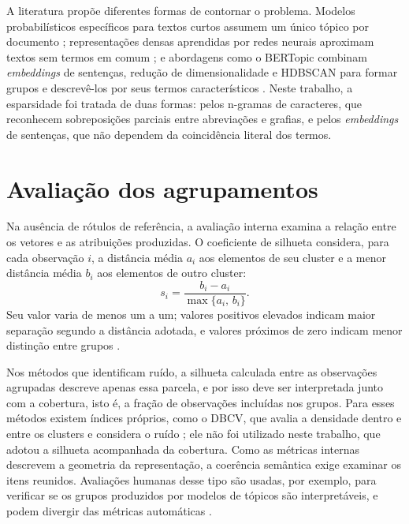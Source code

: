 \documentclass[english,brazilian]{UNISINOSmonografia}
\begin{document}
A literatura propõe diferentes formas de contornar o problema. Modelos probabilísticos específicos para textos curtos assumem um único tópico por documento \cite{yin2014dirichlet}; representações densas aprendidas por redes neurais aproximam textos sem termos em comum \cite{xu2017selftaught}; e abordagens como o BERTopic combinam \textit{embeddings} de sentenças, redução de dimensionalidade e HDBSCAN para formar grupos e descrevê-los por seus termos característicos \cite{grootendorst2022bertopic}. Neste trabalho, a esparsidade foi tratada de duas formas: pelos n-gramas de caracteres, que reconhecem sobreposições parciais entre abreviações e grafias, e pelos \textit{embeddings} de sentenças, que não dependem da coincidência literal dos termos.

\section{Avaliação dos agrupamentos}

Na ausência de rótulos de referência, a avaliação interna examina a relação entre os vetores e as atribuições produzidas. O coeficiente de silhueta \cite{rousseeuw1987silhouettes} considera, para cada observação $i$, a distância média $a_i$ aos elementos de seu cluster e a menor distância média $b_i$ aos elementos de outro cluster:
\begin{equation}
s_i=\frac{b_i-a_i}{\max\{a_i,\, b_i\}}.
\label{eq:silhueta}
\end{equation}
Seu valor varia de menos um a um; valores positivos elevados indicam maior separação segundo a distância adotada, e valores próximos de zero indicam menor distinção entre grupos \cite{sklearn-silhouette}.

Nos métodos que identificam ruído, a silhueta calculada entre as observações agrupadas descreve apenas essa parcela, e por isso deve ser interpretada junto com a cobertura, isto é, a fração de observações incluídas nos grupos. Para esses métodos existem índices próprios, como o DBCV, que avalia a densidade dentro e entre os clusters e considera o ruído \cite{moulavi2014dbcv}; ele não foi utilizado neste trabalho, que adotou a silhueta acompanhada da cobertura. Como as métricas internas descrevem a geometria da representação, a coerência semântica exige examinar os itens reunidos. Avaliações humanas desse tipo são usadas, por exemplo, para verificar se os grupos produzidos por modelos de tópicos são interpretáveis, e podem divergir das métricas automáticas \cite{chang2009readingtealeaves}.
\end{document}

